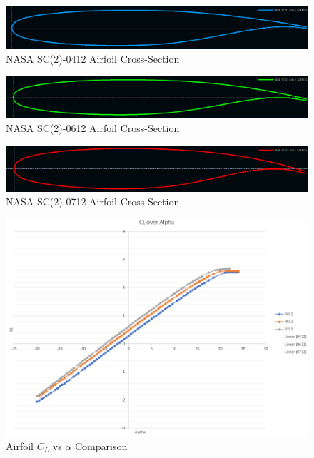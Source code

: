 \begin{figure}[!h]
    \centering
    \includegraphics[width=\textwidth]{Photos/aero/sc0412.png}
    \caption{NASA SC(2)-0412 Airfoil Cross-Section}
    \label{fig:0412airfoil}
\end{figure}
\begin{figure}[!h]
    \centering
    \includegraphics[width=\textwidth]{Photos/aero/sc0612.png}
    \caption{NASA SC(2)-0612 Airfoil Cross-Section}
    \label{fig:0612airfoil}
\end{figure}
\begin{figure}[!h]
    \centering
    \includegraphics[width=\textwidth]{Photos/aero/sc0712.png}
    \caption{NASA SC(2)-0712 Airfoil Cross-Section}
    \label{fig:0712airfoil}
\end{figure}
\clearpage
\begin{figure}[!h]
    \centering
    \includegraphics[width=\textwidth]{Photos/aero/AirfoilAnalysis.png}
    \caption{Airfoil $C_L$ vs $\alpha$ Comparison}
    \label{fig:airfoils}
\end{figure}

